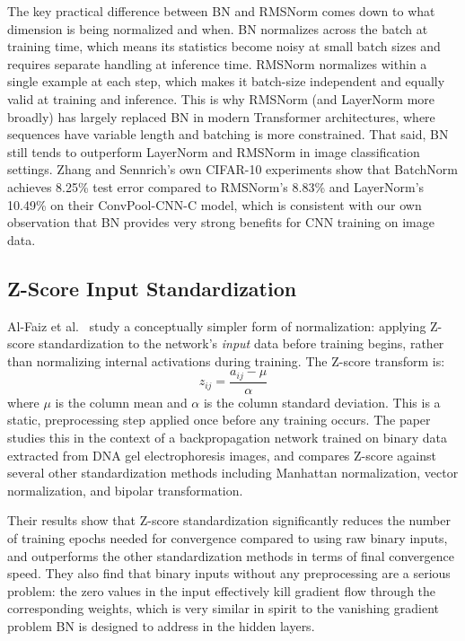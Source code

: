\documentclass{article}
\begin{document}
The key practical difference between BN and RMSNorm comes down to what dimension is being
normalized and when. BN normalizes across the batch at training time, which means its
statistics become noisy at small batch sizes and requires separate handling at inference time.
RMSNorm normalizes within a single example at each step, which makes it batch-size independent
and equally valid at training and inference. This is why RMSNorm (and LayerNorm more broadly)
has largely replaced BN in modern Transformer architectures, where sequences have variable
length and batching is more constrained. That said, BN still tends to outperform LayerNorm and
RMSNorm in image classification settings. Zhang and Sennrich's own CIFAR-10 experiments show
that BatchNorm achieves 8.25\% test error compared to RMSNorm's 8.83\% and LayerNorm's
10.49\% on their ConvPool-CNN-C model, which is consistent with our own observation that BN
provides very strong benefits for CNN training on image data.

\subsection{Z-Score Input Standardization}

Al-Faiz et al.~\cite{alfaiz2018zscore} study a conceptually simpler form of normalization:
applying Z-score standardization to the network's \emph{input} data before training begins,
rather than normalizing internal activations during training. The Z-score transform is:
\begin{equation}
  z_{ij} = \frac{a_{ij} - \mu}{\alpha}
\end{equation}
where $\mu$ is the column mean and $\alpha$ is the column standard deviation. This is a static,
preprocessing step applied once before any training occurs. The paper studies this in the
context of a backpropagation network trained on binary data extracted from DNA gel
electrophoresis images, and compares Z-score against several other standardization methods
including Manhattan normalization, vector normalization, and bipolar transformation.

Their results show that Z-score standardization significantly reduces the number of training
epochs needed for convergence compared to using raw binary inputs, and outperforms the other
standardization methods in terms of final convergence speed. They also find that binary inputs
without any preprocessing are a serious problem: the zero values in the input effectively kill
gradient flow through the corresponding weights, which is very similar in spirit to the
vanishing gradient problem BN is designed to address in the hidden layers.
\end{document}
